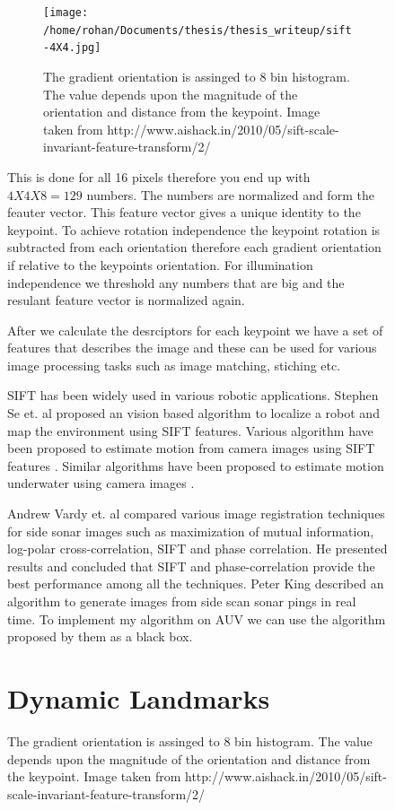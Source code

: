 \documentclass[12pt,draft]{dalcsthesis}
\begin{document}
{{\begin{figure}
\begin{figure}
  \centering
     {\texttt{[image: /home/rohan/Documents/thesis/thesis\_writeup/sift-4X4.jpg]}}
  \caption{\label{fig- sift bin histogram} The gradient orientation is assinged to 8 bin histogram. The value depends upon the magnitude of the orientation and distance from the keypoint. Image taken from \cite{}{http://www.aishack.in/2010/05/sift-scale-invariant-feature-transform/2/} }
\end{figure}

This is done for all 16 pixels therefore you end up with $4X4X8=129$ numbers. The numbers are normalized and form the feauter vector. This feature vector gives a unique identity to the keypoint. To achieve rotation independence the keypoint rotation is subtracted from each orientation therefore each gradient orientation if relative to the keypoints orientation. For illumination independence we threshold any numbers that are big and the resulant feature vector is normalized again. 

After we calculate the desrciptors for each keypoint we have a set of features that describes the image and these can be used for various image processing tasks such as image matching, stiching etc. 

SIFT has  been widely used in various robotic applications. Stephen Se et. al \cite{se2001vision} proposed an vision based algorithm to localize a robot and map the environment using SIFT features. Various algorithm have been proposed to estimate motion from camera images using SIFT features \cite{barfoot2005online} \cite{scaramuzza2008appearance}. Similar algorithms have been proposed to estimate motion underwater using camera images \cite{Silva}.

Andrew Vardy et. al \cite{vandrish2011side} compared various image registration techniques for side sonar images such as  maximization of mutual information, log-polar cross-correlation, SIFT and phase correlation. He presented results and concluded that SIFT and phase-correlation provide the best performance among all the techniques. Peter King \cite{king2012real} described an algorithm to generate images from side scan sonar pings in real time. To implement my algorithm on AUV we can use the algorithm proposed by them as a black box.

\section{Dynamic Landmarks}
\label{ch-: dynamic landmarks}


\end{figure}}}
\end{document}
